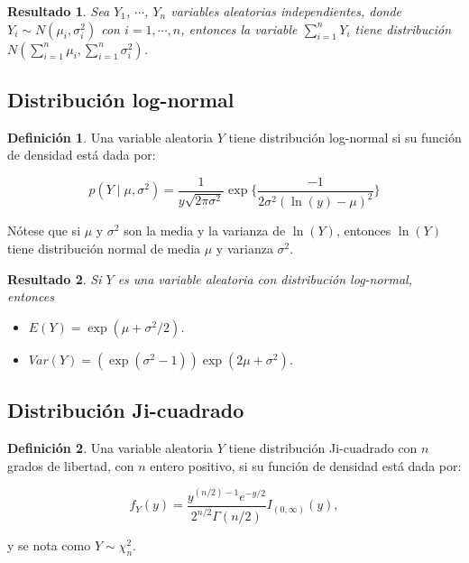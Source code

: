 \documentclass[
  10pt,
  spanish,
]{book}
\providecommand{\tightlist}{%
  \setlength{\itemsep}{0pt}\setlength{\parskip}{0pt}}
\newtheorem{proposition}{Resultado}[chapter]
\theoremstyle{definition}
\newtheorem{definition}{Definición}[chapter]
\theoremstyle{definition}
\theoremstyle{definition}
\theoremstyle{definition}
\theoremstyle{remark}
\begin{document}
\begin{proposition}
\protect\hypertarget{prp:unnamed-chunk-36}{}{\label{prp:unnamed-chunk-36} }Sea \(Y_1\), \(\cdots\), \(Y_n\) variables aleatorias independientes, donde \(Y_i\sim N(\mu_i,\sigma^2_i)\) con \(i=1,\cdots,n\), entonces la variable \(\sum_{i=1}^nY_i\) tiene distribución \(N(\sum_{i=1}^n\mu_i,\sum_{i=1}^n\sigma_i^2)\).
\end{proposition}

\hypertarget{distribuciuxf3n-log-normal}{%
\subsection{Distribución log-normal}\label{distribuciuxf3n-log-normal}}

\begin{definition}
\protect\hypertarget{def:unnamed-chunk-37}{}{\label{def:unnamed-chunk-37} }Una variable aleatoria \(Y\) tiene distribución log-normal si su función de densidad está dada por:

\begin{equation}
p(Y\mid \mu, \sigma^2)=\frac{1}{y\sqrt{2\pi\sigma^2}}\exp\{\frac{-1}{2\sigma^2(\ln(y)-\mu)^2}\}
\end{equation}

Nótese que si \(\mu\) y \(\sigma^2\) son la media y la varianza de \(\ln(Y)\), entonces \(\ln(Y)\) tiene distribución normal de media \(\mu\) y varianza \(\sigma^2\).
\end{definition}

\begin{proposition}
\protect\hypertarget{prp:unnamed-chunk-38}{}{\label{prp:unnamed-chunk-38} }Si \(Y\) es una variable aleatoria con distribución log-normal, entonces

\begin{itemize}
\tightlist
\item
  \(E(Y)=\exp(\mu+\sigma^2/2)\).
\item
  \(Var(Y)=(\exp(\sigma^2-1)) \exp(2\mu+\sigma^2)\).
\end{itemize}
\end{proposition}

\hypertarget{distribuciuxf3n-ji-cuadrado}{%
\subsection{Distribución Ji-cuadrado}\label{distribuciuxf3n-ji-cuadrado}}

\begin{definition}
\protect\hypertarget{def:unnamed-chunk-39}{}{\label{def:unnamed-chunk-39} }Una variable aleatoria \(Y\) tiene distribución Ji-cuadrado con \(n\) grados de libertad, con \(n\) entero positivo, si su función de densidad está dada por:

\begin{equation}
f_Y(y)=\frac{y^{(n/2)-1}e^{-y/2}}{2^{n/2}\Gamma(n/2)}I_{(0,\infty)}(y),
\end{equation}

y se nota como \(Y\sim\chi^2_n\).
\end{definition}
\end{document}
